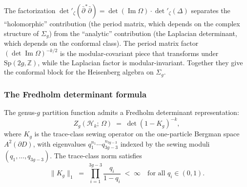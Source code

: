 \begin{remark}
The factorization $\det{}'_\zeta(\bar\partial^*\bar\partial) = \det(\operatorname{Im}\Omega) \cdot \det{}'_\zeta(\Delta)$ separates the ``holomorphic'' contribution (the period matrix, which depends on the complex structure of $\Sigma_g$) from the ``analytic'' contribution (the Laplacian determinant, which depends on the conformal class). The period matrix factor $(\det\operatorname{Im}\Omega)^{-k/2}$ is the modular-covariant piece that transforms under $\mathrm{Sp}(2g,\mathbb{Z})$, while the Laplacian factor is modular-invariant. Together they give the conformal block for the Heisenberg algebra on $\Sigma_g$.
\end{remark}

\subsubsection{The Fredholm determinant formula}

\begin{proposition}
The genus-$g$ partition function admits a Fredholm determinant representation:
\begin{equation}%
Z_g(\mathcal{H}_k;\,\Omega) \;=\; \det(1 - K_g)^{-k},
\end{equation}
where $K_g$ is the trace-class sewing operator on the one-particle Bergman space $A^2(\partial D)$, with eigenvalues $q_1^{n_1} \cdots q_{3g-3}^{n_{3g-3}}$ indexed by the sewing moduli $(q_1, \ldots, q_{3g-3})$. The trace-class norm satisfies
\begin{equation}%
\|K_g\|_1 \;=\; \prod_{i=1}^{3g-3} \frac{q_i}{1-q_i} \;<\; \infty \quad\text{for all } q_i \in (0,1).
\end{equation}
\end{proposition}


